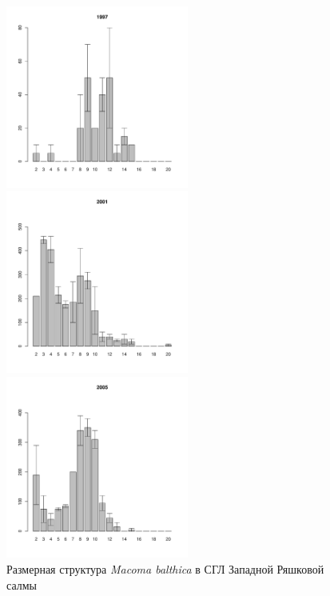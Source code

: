 \begin{figure}[hp]
	\begin{minipage}[b]{.3\linewidth}
	\begin{center}
	\includegraphics[width=60mm]{../White_Sea/Ryashkov_ZRS/zrs2_1997_.pdf}
	\end{center}
	\end{minipage}
	\hfill
	\begin{minipage}[b]{.3\linewidth}
	\begin{center}
	\includegraphics[width=60mm]{../White_Sea/Ryashkov_ZRS/zrs2_2001_.pdf}
	\end{center}
	\end{minipage}
	\hfill
	\begin{minipage}[b]{.3\linewidth}
	\begin{center}
	\includegraphics[width=60mm]{../White_Sea/Ryashkov_ZRS/zrs2_2005_.pdf}
	\end{center}
	\end{minipage}
\caption{Размерная структура {\it Macoma balthica} в СГЛ Западной Ряшковой салмы}
\label{ris:size_str_ZRS}
\end{figure}

